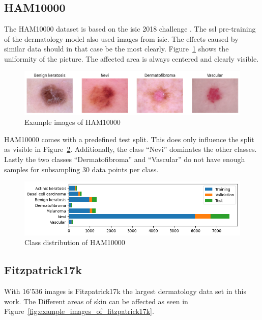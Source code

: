 \subsection{HAM10000}
The HAM10000 dataset is based on the \gls{isic} 2018 challenge \autocite{codella2019}. The \gls{ssl} pre-training of the dermatology model also used images from \gls{isic}. The effects caused by similar data should in that case be the most clearly.
Figure~\ref{fig:example_images_of_ham10000} shows the uniformity of the picture. The affected area is always centered and clearly visible.
\begin{figure}[H]
    \begin{center}
    \includegraphics[width=15cm]{../../images/example_images_of_ham10000.png}
    \caption{Example images of HAM10000}\label{fig:example_images_of_ham10000}
    \end{center}
\end{figure}
HAM10000 comes with a predefined test split. This does only influence the split as visible in Figure~\ref{fig:class_distribution_of_ham10000}.
Additionally, the class ``Nevi'' dominates the other classes. Lastly the two classes ``Dermatofibroma'' and ``Vascular'' do not have enough samples for subsampling 30 data points per class.
\begin{figure}[H]
    \begin{center}
    \includegraphics[width=15cm]{../../images/class_distribution_of_ham10000.png}
    \caption{Class distribution of HAM10000}\label{fig:class_distribution_of_ham10000}
    \end{center}
\end{figure}


\subsection{Fitzpatrick17k}
With 16'536 images is Fitzpatrick17k the largest dermatology data set in this work. The Different areas of skin can be affected as seen in Figure~\ref{fig:example_images_of_fitzpatrick17k}.

